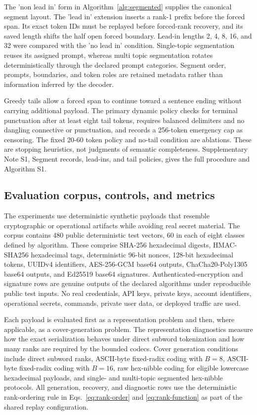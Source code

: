 \documentclass[fleqn,10pt]{wlscirep}
\begin{document}
The 'non lead in' form in Algorithm~\ref{alg:segmented} supplies the canonical segment layout. The 'lead in' extension inserts a rank-1 prefix before the forced span. Its exact token IDs must be replayed before forced-rank recovery, and its saved length shifts the half open forced boundary. Lead-in lengths 2, 4, 8, 16, and 32 were compared with the 'no lead in' condition. Single-topic segmentation reuses its assigned prompt, whereas multi topic segmentation rotates deterministically through the declared prompt categories. Segment order, prompts, boundaries, and token roles are retained metadata rather than information inferred by the decoder.

Greedy tails allow a forced span to continue toward a sentence ending without carrying additional payload. The primary dynamic policy checks for terminal punctuation after at least eight tail tokens, requires balanced delimiters and no dangling connective or punctuation, and records a 256-token emergency cap as censoring. The fixed 20-60 token policy and no-tail condition are ablations. These are stopping heuristics, not judgments of semantic completeness. Supplementary Note S1, Segment records, lead-ins, and tail policies, gives the full procedure and Algorithm S1.

\subsection*{Evaluation corpus, controls, and metrics}\label{sec:design-method}\label{sec:quality-method}

The experiments use deterministic synthetic payloads that resemble cryptographic or operational artifacts while avoiding real secret material. The corpus contains 480 public deterministic test vectors, 60 in each of eight classes defined by algorithm. These comprise SHA-256 hexadecimal digests, HMAC-SHA256 hexadecimal tags, deterministic 96-bit nonces, 128-bit hexadecimal tokens, UUIDv4 identifiers, AES-256-GCM base64 outputs, ChaCha20-Poly1305 base64 outputs, and Ed25519 base64 signatures\cite{NIST2015SecureHashStandard,Krawczyk1997RFC2104,NIST2007GCM,NirLangley2018RFC8439,JosefssonLiusvaara2017RFC8032,Josefsson2006RFC4648,DavisPeabodyLeach2024RFC9562}. Authenticated-encryption and signature rows are genuine outputs of the declared algorithms under reproducible public test inputs. No real credentials, API keys, private keys, account identifiers, operational secrets, commands, private user data, or deployed traffic are used.

Each payload is evaluated first as a representation problem and then, where applicable, as a cover-generation problem. The representation diagnostics measure how the exact serialization behaves under direct subword tokenization and how many ranks are required by the bounded codecs. Cover generation conditions include direct subword ranks, ASCII-byte fixed-radix coding with \(B=8\), ASCII-byte fixed-radix coding with \(B=16\), raw hex-nibble coding for eligible lowercase hexadecimal payloads, and single- and multi-topic segmented hex-nibble protocols. All generation, recovery, and diagnostic rows use the deterministic rank-ordering rule in Eqs.~\eqref{eq:rank-order} and \eqref{eq:rank-function} as part of the shared replay configuration.
\end{document}
